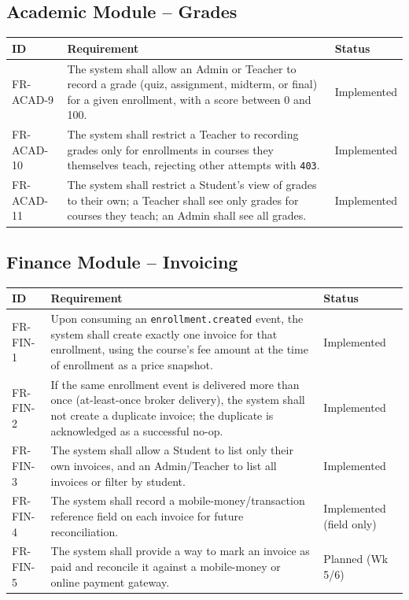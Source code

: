 \documentclass[11pt,a4paper]{report}
\begin{document}
\subsection{Academic Module -- Grades}
\begin{longtable}{p{1.9cm} L{10.3cm} p{2.1cm}}
\toprule
\textbf{ID} & \textbf{Requirement} & \textbf{Status} \\
\midrule
\endhead
FR-ACAD-9 & The system shall allow an Admin or Teacher to record a grade (quiz, assignment, midterm, or final) for a given enrollment, with a score between 0 and 100. & Implemented \\
FR-ACAD-10 & The system shall restrict a Teacher to recording grades only for enrollments in courses they themselves teach, rejecting other attempts with \texttt{403}. & Implemented \\
FR-ACAD-11 & The system shall restrict a Student's view of grades to their own; a Teacher shall see only grades for courses they teach; an Admin shall see all grades. & Implemented \\
\bottomrule
\end{longtable}

\subsection{Finance Module -- Invoicing}
\begin{longtable}{p{1.9cm} L{10.3cm} p{2.1cm}}
\toprule
\textbf{ID} & \textbf{Requirement} & \textbf{Status} \\
\midrule
\endhead
FR-FIN-1 & Upon consuming an \texttt{enrollment.created} event, the system shall create exactly one invoice for that enrollment, using the course's fee amount at the time of enrollment as a price snapshot. & Implemented \\
FR-FIN-2 & If the same enrollment event is delivered more than once (at-least-once broker delivery), the system shall not create a duplicate invoice; the duplicate is acknowledged as a successful no-op. & Implemented \\
FR-FIN-3 & The system shall allow a Student to list only their own invoices, and an Admin/Teacher to list all invoices or filter by student. & Implemented \\
FR-FIN-4 & The system shall record a mobile-money/transaction reference field on each invoice for future reconciliation. & Implemented (field only) \\
FR-FIN-5 & The system shall provide a way to mark an invoice as paid and reconcile it against a mobile-money or online payment gateway. & Planned (Wk 5/6) \\
\bottomrule
\end{longtable}
\end{document}

